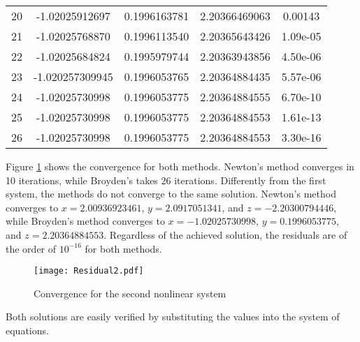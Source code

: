 \begin{table}[H]
\begin{tabular}{ccccc}
        20 & -1.02025912697 & 0.1996163781 & 2.20366469063 & 0.00143\\
        21 & -1.02025768870 & 0.1996113540 & 2.20365643426 & 1.09e-05\\
        22 & -1.02025684824 & 0.1995979744 & 2.20363943856 & 4.50e-06\\
        23& -1.020257309945 & 0.1996053765 & 2.20364884435 & 5.57e-06\\
        24 & -1.02025730998 & 0.1996053775 & 2.20364884555 & 6.70e-10\\
        25 & -1.02025730998 & 0.1996053775 & 2.20364884553 & 1.61e-13\\
        26 & -1.02025730998 & 0.1996053775 & 2.20364884553 & 3.30e-16\\ 
        \hline
    \end{tabular}
    \label{tab:Sys2}
\end{table}

Figure \ref{fig:Sys2} shows the convergence for both methods. Newton's method converges in 10 iterations, while Broyden's takes 26 iterations. Differently from the first system, the methods do not converge to the same solution. Newton's method converges to $x = 2.00936923461$, $y = 2.0917051341$, and $z = -2.20300794446$, while Broyden's method converges to $x = -1.02025730998$, $y = 0.1996053775$, and $z = 2.20364884553$. Regardless of the achieved solution, the residuals are of the order of $10^{-16}$ for both methods.
\begin{figure}[H]
    \centering
    \texttt{[image: Residual2.pdf]}
    \caption{Convergence for the second nonlinear system}
    \label{fig:Sys2}
\end{figure}

Both solutions are easily verified by substituting the values into the system of equations. 